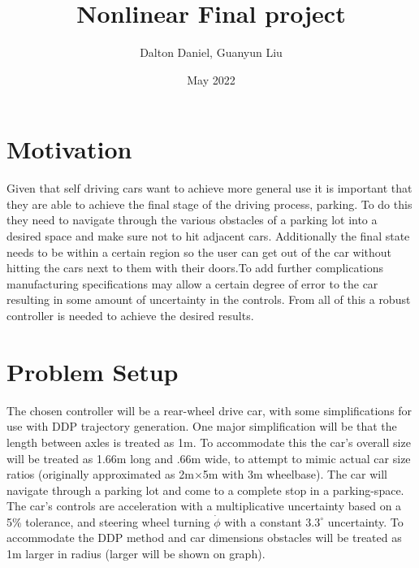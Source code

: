 \documentclass[letterpaper, 12pt]{article}
\title{Nonlinear Final project}
\author{Dalton Daniel, Guanyun Liu}
\date{May 2022}
\begin{document}
\maketitle
\section{Motivation}
Given that self driving cars want to achieve more general use it is important that they are able to achieve the final stage of the driving process, parking. To do this they need to navigate through the various obstacles of a parking lot into a desired space and make sure not to hit adjacent cars. Additionally the final state needs to be within a certain region so the user can get out of the car without hitting the cars next to them with their doors.To add further complications manufacturing specifications may allow a certain degree of error to the car resulting in some amount of uncertainty in the controls. From all of this a robust controller is needed to achieve the desired results.
\section{Problem Setup}
The chosen controller will be a rear-wheel drive car, with some simplifications for use with DDP trajectory generation. One major simplification will be that the length between axles is treated as 1m. To accommodate this the car's overall size will be treated as 1.66m long and .66m wide, to attempt to mimic actual car size ratios (originally approximated as 2m$\times$5m with 3m wheelbase). The car will navigate through a parking lot and come to a complete stop in a parking-space. The car's controls are acceleration with a multiplicative uncertainty based on a 5\% tolerance, and steering wheel turning $\dot{\phi}$ with a constant $3.3^\circ$ uncertainty. To accommodate the DDP method and car dimensions obstacles will be treated as 1m larger in radius (larger will be shown on graph).
\end{document}
